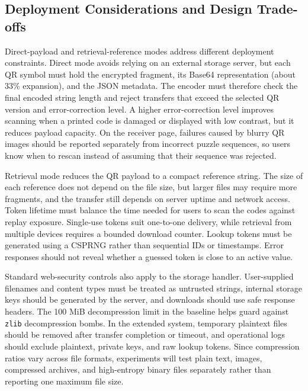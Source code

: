 \documentclass[conference]{IEEEtran}
\begin{document}
\subsection{Deployment Considerations and Design Trade-offs}
Direct-payload and retrieval-reference modes address different deployment constraints. Direct mode avoids relying on an external storage server, but each QR symbol must hold the encrypted fragment, its Base64 representation (about 33\% expansion), and the JSON metadata. The encoder must therefore check the final encoded string length and reject transfers that exceed the selected QR version and error-correction level. A higher error-correction level improves scanning when a printed code is damaged or displayed with low contrast, but it reduces payload capacity. On the receiver page, failures caused by blurry QR images should be reported separately from incorrect puzzle sequences, so users know when to rescan instead of assuming that their sequence was rejected.

Retrieval mode reduces the QR payload to a compact reference string. The size of each reference does not depend on the file size, but larger files may require more fragments, and the transfer still depends on server uptime and network access. Token lifetime must balance the time needed for users to scan the codes against replay exposure. Single-use tokens suit one-to-one delivery, while retrieval from multiple devices requires a bounded download counter. Lookup tokens must be generated using a CSPRNG rather than sequential IDs or timestamps. Error responses should not reveal whether a guessed token is close to an active value.

Standard web-security controls also apply to the storage handler. User-supplied filenames and content types must be treated as untrusted strings, internal storage keys should be generated by the server, and downloads should use safe response headers. The 100 MiB decompression limit in the baseline helps guard against \texttt{zlib} decompression bombs. In the extended system, temporary plaintext files should be removed after transfer completion or timeout, and operational logs should exclude plaintext, private keys, and raw lookup tokens. Since compression ratios vary across file formats, experiments will test plain text, images, compressed archives, and high-entropy binary files separately rather than reporting one maximum file size.
\end{document}
